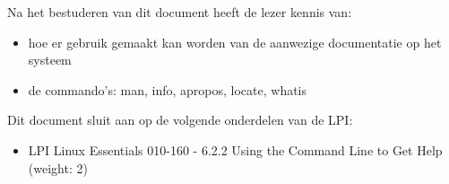 Na het bestuderen van dit document heeft de lezer kennis van:
\begin{itemize}
\item hoe er gebruik gemaakt kan worden van de aanwezige documentatie op het systeem
\item de commando's: man, info, apropos, locate, whatis
\end{itemize}

Dit document sluit aan op de volgende onderdelen van de LPI:
\begin{itemize}
\item LPI Linux Essentials 010-160 - 6.2.2 Using the Command Line to Get Help (weight: 2)
\end{itemize}

